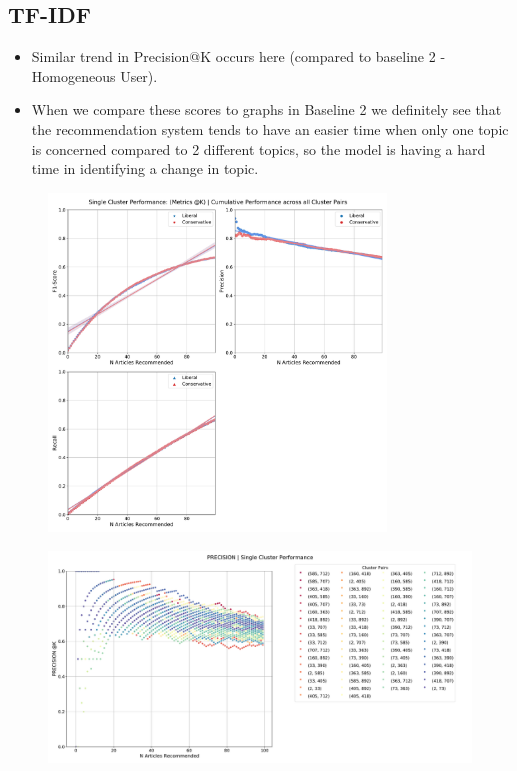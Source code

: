 \documentclass[a4paper,fontsize=8.0pt]{scrartcl}
\begin{document}
\subsection{TF-IDF}
\begin{flushleft}
\begin{itemize}
    \item Similar trend in Precision@K occurs here (compared to baseline 2 - Homogeneous User). 
    \item  When we compare these scores to graphs in Baseline 2 we definitely see that the recommendation system tends to have an easier time when only one topic is concerned compared to 2 different topics, so the model is having a hard time in identifying a change in topic.
\end{itemize}
\end{flushleft}
\begin{figure}[H]
 \includegraphics[width=0.8\textwidth]{Graphs/TFIDF/user_interaction_vs_model_performance_cumu_single_cluster.pdf}
\end{figure}
\begin{figure}[H]
 \includegraphics[width=1.0\textwidth]{Graphs/TFIDF/user_interaction_vs_model_performance_precision_all_cps_single_cluster.pdf}
\end{figure}
\end{document}
